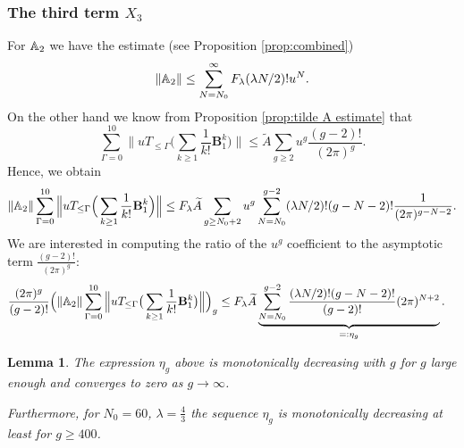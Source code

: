 \documentclass[12pt]{amsart}
\newtheorem{lem}[thm]{Lemma}
\theoremstyle{definition}
\numberwithin{equation}{section}
\renewcommand{\tilde}{\widetilde}
\newcommand{\bB}{\mathbf{B}}
\theoremstyle{definition} %
\theoremstyle{remark}
\begin{document}
\subsubsection{The third term $X_3$}
For $\mathbb{A}_2$ we have the estimate (see Proposition \ref{prop:combined}) 
\[
   \|\mathbb{A}_2\| \leq \sum_{N=N_0}^{\infty}  F_\lambda (\lambda N/2)!  u^N.
\] 
On the other hand we know from Proposition \ref{prop:tilde A estimate} that 
\[
    \sum_{\Gamma=0}^{10}
    \Big\|uT_{\leq \Gamma}\Big(\sum_{k\geq 1}\frac 1 {k!} \bB_1^k\Big) \Big\|
    \leq \tilde A \sum_{g\geq 2} u^g
    \frac{(g-2)!}{(2\pi)^g}.
\]
Hence, we obtain
\[
\|\bbA_2\| 
    \sum_{\Gamma=0}^{10}
    \Big\|uT_{\leq \Gamma}\Big(\sum_{k\geq 1}\frac 1 {k!} \bB_1^k\Big) \Big\|
\leq 
F_\lambda \tilde A \sum_{g\geq N_0+2}u^g 
\sum_{N=N_0}^{g-2}
(\lambda N/2)! (g-N-2)!\frac{1}{(2\pi)^{g-N-2}}. 
\]
We are interested in computing the ratio of the $u^g$ coefficient to the asymptotic term $\frac{(g-2)!}{(2\pi)^g}$:
\newcommand{\eb}{\eta}
\begin{align*}
& \frac{(2\pi)^g}{(g-2)!}
 \Big(\|\bbA_2\| 
    \sum_{\Gamma=0}^{10}
    \Big\|uT_{\leq \Gamma}\big(\sum_{k\geq 1}\frac 1 {k!} \bB_1^k\big) \Big\|\Big)_{g}
\leq 
F_\lambda \tilde A
\underbrace{
\sum_{N=N_0}^{g-2}
\frac{(\lambda N/2)!(g-N-2)!}{(g-2)!}(2\pi)^{N+2}}_{=:\eb_g}.
\end{align*}
\begin{lem}
The expression $\eb_g$ above is monotonically decreasing with $g$ for $g$ large enough and converges to zero as $g\to \infty$.

Furthermore, for $N_0=60$, $\lambda=\frac43$ the sequence $\eb_g$ is monotonically decreasing at least for $g\geq 400$.
\end{lem}
\end{document}
